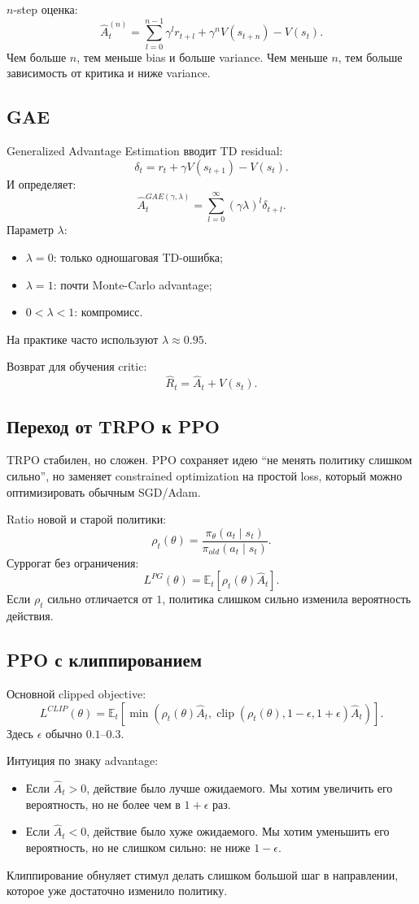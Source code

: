 \documentclass[11pt,a4paper]{article}
\newcommand{\E}{\mathbb{E}}
\newcommand{\clip}{\operatorname{clip}}
\newcommand{\1}{\mathbf{1}}
\begin{document}
$n$-step оценка:
\[
    \hat A_t^{(n)}=\sum_{l=0}^{n-1}\gamma^l r_{t+l}+\gamma^nV(s_{t+n})-V(s_t).
\]
Чем больше $n$, тем меньше bias и больше variance. Чем меньше $n$, тем больше зависимость от критика и ниже variance.

\subsection*{GAE}
Generalized Advantage Estimation вводит TD residual:
\[
    \delta_t=r_t+\gamma V(s_{t+1})-V(s_t).
\]
И определяет:
\[
    \hat A_t^{GAE(\gamma,\lambda)}=\sum_{l=0}^{\infty}(\gamma\lambda)^l\delta_{t+l}.
\]
Параметр $\lambda$:
\begin{itemize}
    \item $\lambda=0$: только одношаговая TD-ошибка;
    \item $\lambda=1$: почти Monte-Carlo advantage;
    \item $0<\lambda<1$: компромисс.
\end{itemize}
На практике часто используют $\lambda\approx0.95$.

Возврат для обучения critic:
\[
    \hat R_t=\hat A_t+V(s_t).
\]

\subsection*{Переход от TRPO к PPO}
TRPO стабилен, но сложен. PPO сохраняет идею ``не менять политику слишком сильно'', но заменяет constrained optimization на простой loss, который можно оптимизировать обычным SGD/Adam.

Ratio новой и старой политики:
\[
    \rho_t(\theta)=\frac{\pi_\theta(a_t\mid s_t)}{\pi_{old}(a_t\mid s_t)}.
\]
Суррогат без ограничения:
\[
    L^{PG}(\theta)=\E_t[\rho_t(\theta)\hat A_t].
\]
Если $\rho_t$ сильно отличается от $1$, политика слишком сильно изменила вероятность действия.

\subsection*{PPO с клиппированием}
Основной clipped objective:
\[
    L^{CLIP}(\theta)=\E_t\left[
    \min\left(
    \rho_t(\theta)\hat A_t,
    \clip(\rho_t(\theta),1-\epsilon,1+\epsilon)\hat A_t
    \right)
    \right].
\]
Здесь $\epsilon$ обычно $0.1$--$0.3$.

Интуиция по знаку advantage:
\begin{itemize}
    \item Если $\hat A_t>0$, действие было лучше ожидаемого. Мы хотим увеличить его вероятность, но не более чем в $1+\epsilon$ раз.
    \item Если $\hat A_t<0$, действие было хуже ожидаемого. Мы хотим уменьшить его вероятность, но не слишком сильно: не ниже $1-\epsilon$.
\end{itemize}
Клиппирование обнуляет стимул делать слишком большой шаг в направлении, которое уже достаточно изменило политику.
\end{document}
